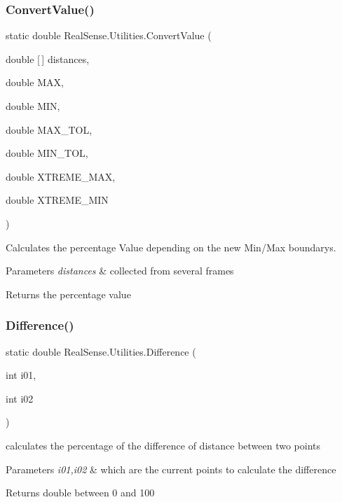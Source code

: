 \subsubsection{Convert\+Value()}
{\footnotesize\ttfamily static double Real\+Sense.\+Utilities.\+Convert\+Value (\begin{DoxyParamCaption}\item[{double [$\,$]}]{distances,  }\item[{double}]{M\+AX,  }\item[{double}]{M\+IN,  }\item[{double}]{M\+A\+X\+\_\+\+T\+OL,  }\item[{double}]{M\+I\+N\+\_\+\+T\+OL,  }\item[{double}]{X\+T\+R\+E\+M\+E\+\_\+\+M\+AX,  }\item[{double}]{X\+T\+R\+E\+M\+E\+\_\+\+M\+IN }\end{DoxyParamCaption})\hspace{0.3cm}{\ttfamily [static]}}

Calculates the percentage Value depending on the new Min/\+Max boundarys. 
\begin{DoxyParams}{Parameters}
{\em distances} & collected from several frames \\
\hline
\end{DoxyParams}
\begin{DoxyReturn}{Returns}
the percentage value 
\end{DoxyReturn}
\mbox{\label{class_real_sense_1_1_utilities_afb6700357b260189d5309e5c15463ad8}} 
\subsubsection{Difference()}
{\footnotesize\ttfamily static double Real\+Sense.\+Utilities.\+Difference (\begin{DoxyParamCaption}\item[{int}]{i01,  }\item[{int}]{i02 }\end{DoxyParamCaption})\hspace{0.3cm}{\ttfamily [static]}}

calculates the percentage of the difference of distance between two points 
\begin{DoxyParams}{Parameters}
{\em i01,i02} & which are the current points to calculate the difference \\
\hline
\end{DoxyParams}
\begin{DoxyReturn}{Returns}
double between 0 and 100 
\end{DoxyReturn}
\mbox{\label{class_real_sense_1_1_utilities_a46ab13ced92a5c23b776d553eecb6a8a}} 
